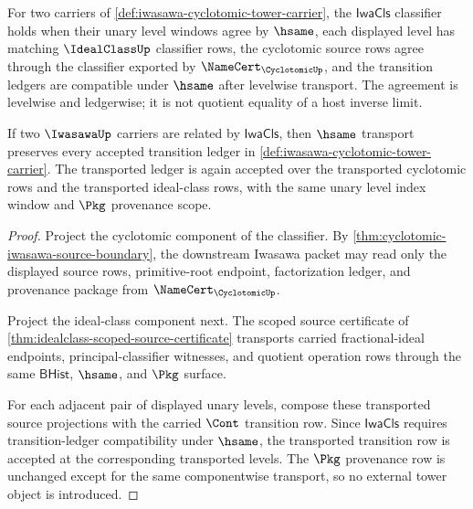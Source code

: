 \begin{definition}
\label{def:iwasawa-classgroup-limit-classifier}
For two carriers of \autoref{def:iwasawa-cyclotomic-tower-carrier}, the
$\mathsf{IwaCls}$ classifier holds when their unary level windows agree by
$\hsame$, each displayed level has matching $\IdealClassUp$ classifier rows,
the cyclotomic source rows agree through the classifier exported by
$\NameCert_{\CyclotomicUp}$, and the transition ledgers are compatible under
$\hsame$ after levelwise transport. The agreement is levelwise and ledgerwise;
it is not quotient equality of a host inverse limit.
\end{definition}

\begin{theorem}
\label{thm:iwasawa-transition-ledger-stability}
If two $\IwasawaUp$ carriers are related by $\mathsf{IwaCls}$, then $\hsame$
transport preserves every accepted transition ledger in
\autoref{def:iwasawa-cyclotomic-tower-carrier}. The transported ledger is again
accepted over the transported cyclotomic rows and the transported ideal-class
rows, with the same unary level index window and $\Pkg$ provenance scope.
\end{theorem}
\begin{proof}
Project the cyclotomic component of the classifier. By
\autoref{thm:cyclotomic-iwasawa-source-boundary}, the downstream Iwasawa packet
may read only the displayed source rows, primitive-root endpoint, factorization
ledger, and provenance package from $\NameCert_{\CyclotomicUp}$.

Project the ideal-class component next. The scoped source certificate of
\autoref{thm:idealclass-scoped-source-certificate} transports carried
fractional-ideal endpoints, principal-classifier witnesses, and quotient
operation rows through the same $\mathsf{BHist}$, $\hsame$, and $\Pkg$ surface.

For each adjacent pair of displayed unary levels, compose these transported
source projections with the carried $\Cont$ transition row. Since
$\mathsf{IwaCls}$ requires transition-ledger compatibility under $\hsame$, the
transported transition row is accepted at the corresponding transported levels.
The $\Pkg$ provenance row is unchanged except for the same componentwise
transport, so no external tower object is introduced.
\end{proof}


